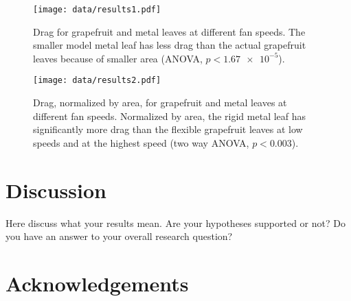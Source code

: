 \documentclass{article}
\begin{document}
\begin{figure}
\begin{center}
\texttt{[image: data/results1.pdf]}
\end{center}
\caption{Drag for grapefruit and metal leaves at different fan speeds. The smaller model metal leaf has less drag than the actual grapefruit leaves because of smaller area (ANOVA, $p<\num{1.67e-5}$).}
\label{fig:results1}
\end{figure}

\begin{figure}
\begin{center}
\texttt{[image: data/results2.pdf]}
\end{center}
\caption{Drag, normalized by area, for grapefruit and metal leaves at different fan speeds. Normalized by area, the rigid metal leaf has significantly more drag than the flexible grapefruit leaves at low speeds and at the highest speed (two way ANOVA, $p<0.003$).}
\label{fig:results2}
\end{figure}



\section{Discussion}
Here discuss what your results mean. Are your hypotheses supported or not? Do you have an answer to your overall research question?

\section{Acknowledgements}


\end{document}
